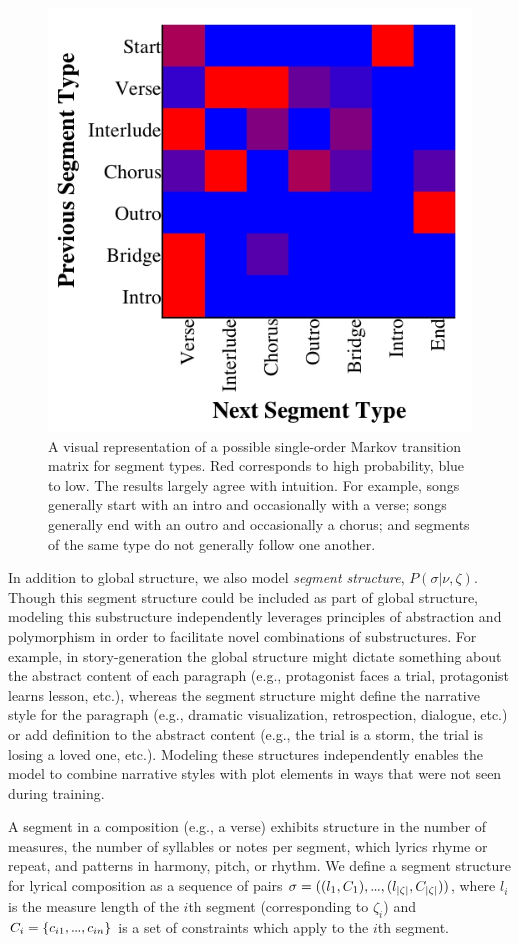 \documentclass[phd,electronic,oneside,twosidetoc,letterpaper,chaptercenter,parttop,lof,lot]{byumsphd}
\newcommand\mydots{\hbox to .75em{.\hss.\hss.}}
\begin{document}
\begin{figure}
	\centering
	\includegraphics[width=.6\linewidth]{segment_transitions}
	\caption{\label{fig:segment_transitions} A visual representation of a possible single-order Markov transition matrix for segment types. Red corresponds to high probability, blue to low. The results largely agree with intuition. For example, songs generally start with an intro and occasionally with a verse; songs generally end with an outro and occasionally a chorus; and segments of the same type do not generally follow one another.}
\end{figure}

In addition to global structure, we also model \emph{segment structure}, $P(\sigma|\nu,\zeta)$. Though this segment structure could be included as part of global structure, modeling this substructure independently leverages principles of abstraction and polymorphism in order to facilitate novel combinations of substructures. For example, in story-generation the global structure might dictate something about the abstract content of each paragraph (e.g., protagonist faces a trial, protagonist learns lesson, etc.), whereas the segment structure might define the narrative style for the paragraph (e.g., dramatic visualization, retrospection, dialogue, etc.) or add definition to the abstract content (e.g., the trial is a storm, the trial is losing a loved one, etc.). Modeling these structures independently enables the model to combine narrative styles with plot elements in ways that were not seen during training.

A segment in a composition (e.g., a verse) exhibits structure in the number of measures, the number of syllables or notes per segment, which lyrics rhyme or repeat, and patterns in harmony, pitch, or rhythm. We define a segment structure for lyrical composition as a sequence of pairs $\sigma = ((l_1,C_1),\mydots,(l_{|\zeta|},C_{|\zeta|}))$, where $l_i$ is the measure length of the $i$th segment (corresponding to $\zeta_i$) and $C_i = \{{c_{i1},\mydots,c_{in}}\}$ is a set of constraints which apply to the $i$th segment.
\end{document}
